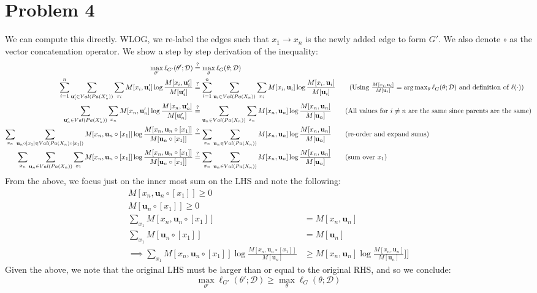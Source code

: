 \documentclass[12pt]{article}
\begin{document}
\pagebreak
\section*{Problem 4}

We can compute this directly. WLOG, we re-label the edges such that $x_1 \to x_n$ is the newly added edge to form $G'$. We also denote $\circ$ as the vector concatenation operator. We show a step by step derivation of the inequality:
\begin{align*}
\max_{\theta'} \ell_{G'}(\theta';\mathcal{D}) &\stackrel{?}{=} \max_{\theta} \ell_{G}(\theta;\mathcal{D}) \\
\sum_{i=1}^n \sum_{\textbf{u}_i' \in Val(Pa(X_n'))}\sum_{x_i} M[x_i, \textbf{u}_i'] \log\frac{M[x_i, \textbf{u}_i']}{M[\textbf{u}_i']}  &\stackrel{?}{=} \sum_{i=1}^n \sum_{\textbf{u}_i \in Val(Pa(X_n))}\sum_{x_i} M[x_i, \textbf{u}_i] \log\frac{M[x_i, \textbf{u}_i]}{M[\textbf{u}_i]} \tag{Using $\frac{M[x_i, \textbf{u}_i]}{M[\textbf{u}_i]} = \arg\max_{\theta} \ell_{G}(\theta;\mathcal{D})$ and definition of $\ell(\cdot)$} \\
\sum_{\textbf{u}_n' \in Val(Pa(X_n'))}\sum_{x_n} M[x_n, \textbf{u}_n'] \log\frac{M[x_n, \textbf{u}_n']}{M[\textbf{u}_n']}  &\stackrel{?}{=} \sum_{\textbf{u}_n \in Val(Pa(X_n))}\sum_{x_n} M[x_n, \textbf{u}_n] \log\frac{M[x_n, \textbf{u}_n]}{M[\textbf{u}_n]} \tag{All values for $i \neq n$ are the same since parents are the same} \\
\sum_{x_n}\sum_{\textbf{u}_n \circ [x_1] \in Val(Pa(X_n) \circ [x_1])} M[x_n, \textbf{u}_n \circ [x_1]] \log\frac{M[x_n, \textbf{u}_n \circ [x_1]]}{M[\textbf{u}_n \circ [x_1]]}  &\stackrel{?}{=}\sum_{x_n} \sum_{\textbf{u}_n \in Val(Pa(X_n))} M[x_n, \textbf{u}_n] \log\frac{M[x_n, \textbf{u}_n]}{M[\textbf{u}_n]} \tag{re-order and expand sums} \\
\sum_{x_n}\sum_{\textbf{u}_n \in Val(Pa(X_n))} \sum_{x_1} M[x_n, \textbf{u}_n \circ [x_1]] \log\frac{M[x_n, \textbf{u}_n \circ [x_1]]}{M[\textbf{u}_n \circ [x_1]]}  &\stackrel{?}{=} \sum_{x_n}\sum_{\textbf{u}_n \in Val(Pa(X_n))} M[x_n, \textbf{u}_n] \log\frac{M[x_n, \textbf{u}_n]}{M[\textbf{u}_n]} \tag{sum over $x_1$}
\end{align*}
From the above, we focus just on the inner most sum on the LHS and note the following:
\begin{align*}
M[x_n, \textbf{u}_n \circ [x_1]] \geq 0 \\
M[\textbf{u}_n \circ [x_1]] \geq 0 \\
\sum_{x_1} M[x_n, \textbf{u}_n \circ [x_1]] &= M[x_n, \textbf{u}_n] \\
\sum_{x_1} M[\textbf{u}_n \circ [x_1]] &= M[\textbf{u}_n] \\
\implies \sum_{x_1}M[x_n, \textbf{u}_n \circ [x_1]] \log \frac{M[x_n, \textbf{u}_n \circ [x_1]]}{M[\textbf{u}_n]} &\geq M[x_n, \textbf{u}_n ] \log \frac{M[x_n, \textbf{u}_n ]}{M[\textbf{u}_n]} ]] \tag{by the log sum inequality}
\end{align*}
Given the above, we note that the original LHS must be larger than or equal to the original RHS, and so we conclude:
$$
\max_{\theta'} \ell_{G'}(\theta';\mathcal{D}) \geq \max_{\theta} \ell_{G}(\theta;\mathcal{D})
$$
\end{document}

